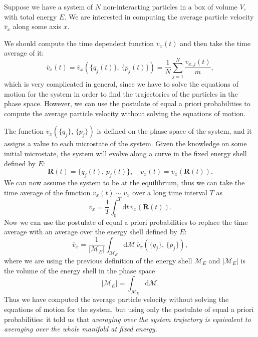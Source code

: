 \begin{example}
    Suppose we have a system of \(N\) non-interacting particles in a box of volume \(V\), with total energy \(E\). We are interested in computing the average particle velocity \(\overline{v}_x\) along some axis \(x\).

    We should compute the time dependent function \(v_x(t)\) and then take the time average of it:
    \[
        \overline{v}_x (t) = \overline{v}_x(\{q_j(t)\},\,\{p_j(t)\}) = \frac{1}{N} \sum_{j=1}^N \frac{v_{x,j}(t)}{m},
    \]
    which is very complicated in general, since we have to solve the equations of motion for the system in order to find the trajectories of the particles in the phase space. However, we can use the postulate of equal a priori probabilities to compute the average particle velocity without solving the equations of motion.

    The function \(\overline{v}_x(\{q_j\},\,\{p_j\})\) is defined on the phase space of the system, and it assigns a value to each microstate of the system. Given the knowledge on some initial microstate, the system will evolve along a curve in the fixed energy shell defined by \(E\):
    \[
        \mathbf{R}(t) = \{q_j(t),\, p_j(t)\}, \quad \overline{v}_x(t) = \overline{v}_x(\mathbf{R}(t)).
    \]
    We can now assume the system to be at the equilibrium, thus we can take the time average of the function \(\overline{v}_x(t) \sim \overline{v}_x\) over a long time interval \(T\) as
    \begin{equation}
        \overline{v}_x = \frac{1}{T} \int_0^T \mathrm{d}t \, \overline{v}_x(\mathbf{R}(t)).
        \label{eq:equilibrium_time_average}
    \end{equation}
    Now we can use the postulate of equal a priori probabilities to replace the time average with an average over the energy shell defined by \(E\):
    \begin{equation}
        \overline{v}_x = \frac{1}{| \mathcal{M}_E |} \int_{\mathcal{M}_E} \mathrm{d} \mathcal{M} \, \overline{v}_x(\{q_j\},\,\{p_j\}),
        \label{eq:equilibrium_ensemble_average}
    \end{equation}
    where we are using the previous definition of the energy shell \(\mathcal{M}_E\) and \(|\mathcal{M}_E|\) is the volume of the energy shell in the phase space
    \[
        | \mathcal{M}_E | = \int_{\mathcal{M}_E} \mathrm{d} \mathcal{M}.
    \]
    Thus we have computed the average particle velocity without solving the equations of motion for the system, but using only the postulate of equal a priori probabilities: it told us that \textit{averaging over the system trajectory is equivalent to averaging over the whole manifold at fixed energy.}
\end{example}

